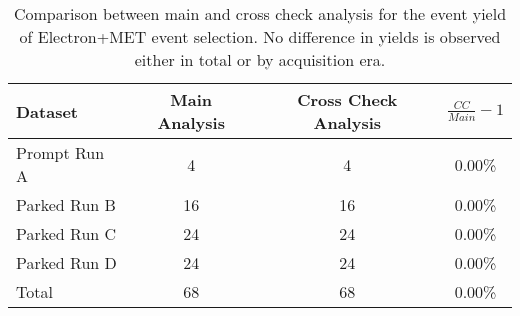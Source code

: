 \begin{table}[!htp]
  \centering
  
\begin{tabular}{|l|c|c||c|}
  \hline
  Dataset & Main Analysis & Cross Check Analysis & $\frac{CC}{Main}-1$ \\ 
  \hline \hline
  Prompt Run A &  4 &  4 & 0.00\% \\
  Parked Run B & 16 & 16 & 0.00\% \\
  Parked Run C & 24 & 24 & 0.00\% \\
  Parked Run D & 24 & 24 & 0.00\% \\
  \hline \hline
  Total & 68 & 68 & 0.00\% \\
  \hline
\end{tabular}

\caption{Comparison between main and cross check analysis for the event yield of Electron+MET event selection. No difference in yields is observed either in total or by acquisition era.}
\end{table}